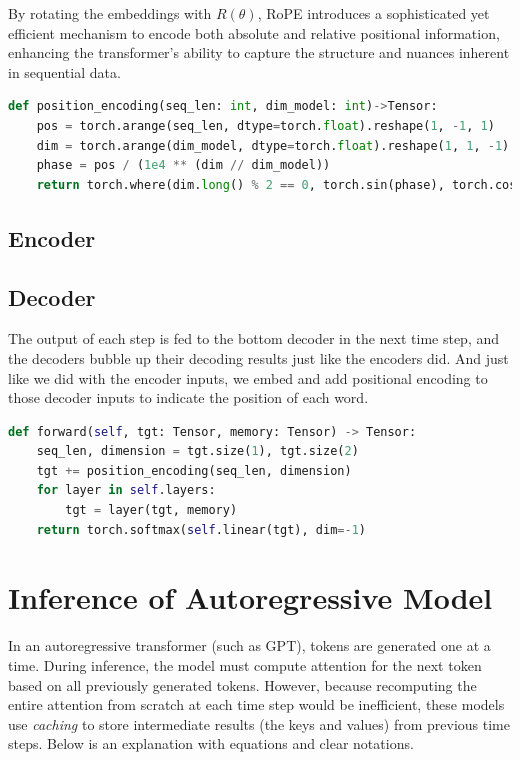 By rotating the embeddings with \(R(\theta)\), RoPE introduces a sophisticated yet efficient mechanism to encode both absolute and relative positional information, enhancing the transformer’s ability to capture the structure and nuances inherent in sequential data.


\begin{lstlisting}[language=Python]
def position_encoding(seq_len: int, dim_model: int)->Tensor:
    pos = torch.arange(seq_len, dtype=torch.float).reshape(1, -1, 1)
    dim = torch.arange(dim_model, dtype=torch.float).reshape(1, 1, -1)
    phase = pos / (1e4 ** (dim // dim_model))
    return torch.where(dim.long() % 2 == 0, torch.sin(phase), torch.cos(phase))
\end{lstlisting}


\subsection{Encoder}

\subsection{Decoder}
The output of each step is fed to the bottom decoder in the next time step, and the decoders bubble up their decoding results just like the encoders did. And just like we did with the encoder inputs, we embed and add positional encoding to those decoder inputs to indicate the position of each word.

\begin{lstlisting}[language=Python]
def forward(self, tgt: Tensor, memory: Tensor) -> Tensor:
	seq_len, dimension = tgt.size(1), tgt.size(2)
	tgt += position_encoding(seq_len, dimension)
	for layer in self.layers:
		tgt = layer(tgt, memory)
	return torch.softmax(self.linear(tgt), dim=-1)
\end{lstlisting}


\section{Inference of Autoregressive Model}

In an autoregressive transformer (such as GPT), tokens are generated one at a time. During inference, the model must compute attention for the next token based on all previously generated tokens. However, because recomputing the entire attention from scratch at each time step would be inefficient, these models use \textit{caching} to store intermediate results (the keys and values) from previous time steps. Below is an explanation with equations and clear notations.

